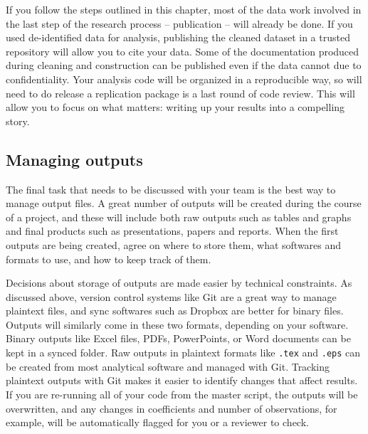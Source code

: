 If you follow the steps outlined in this chapter,
most of the data work involved in the last step of the research process
-- publication -- will already be done.
If you used de-identified data for analysis,
publishing the cleaned dataset in a trusted repository will allow you to cite your data.
Some of the documentation produced during cleaning and construction can be published
even if the data cannot due to confidentiality.
Your analysis code will be organized in a reproducible way,
so will need to do release a replication package is a last round of code review.
This will allow you to focus on what matters:
writing up your results into a compelling story.

\subsection{Managing outputs}

The final task that needs to be discussed with your team is the best way to manage output files.
A great number of outputs will be created during the course of a project,
and these will include both raw outputs such as tables and graphs
and final products such as presentations, papers and reports.
When the first outputs are being created, agree on where to store them,
what softwares and formats to use, and how to keep track of them.

Decisions about storage of outputs are made easier by technical constraints.
As discussed above, version control systems like Git are a great way to manage
plaintext files, and sync softwares such as Dropbox are better for binary files.
Outputs will similarly come in these two formats, depending on your software.
Binary outputs like Excel files, PDFs, PowerPoints, or Word documents can be kept in a synced folder.
Raw outputs in plaintext formats like \texttt{.tex} and \texttt{.eps}
can be created from most analytical software and managed with Git.
Tracking plaintext outputs with Git makes it easier to identify changes that affect results.
If you are re-running all of your code from the master script,
the outputs will be overwritten,
and any changes in coefficients and number of observations, for example,
will be automatically flagged for you or a reviewer to check.

